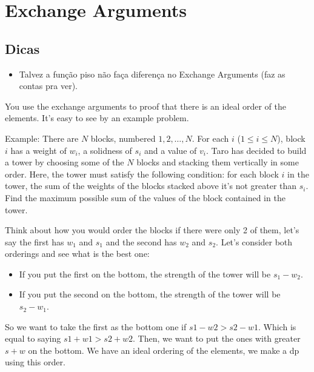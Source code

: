 \section{Exchange Arguments}

\subsection{Dicas}
\begin{itemize}
    \item Talvez a função piso não faça diferença no Exchange Arguments (faz as contas pra ver).
\end{itemize}

You use the exchange arguments to proof that there is an ideal order of the elements. It's easy to see 
by an example problem.

Example: There are $N$ blocks, numbered $1,2,\dots, N$. For each $i$ ($1 \le i \le N$), 
block $i$ has a weight of $w_i$, a solidness of $s_i$ and a value of $v_i$. Taro has decided to build 
a tower by choosing some of the $N$ blocks and stacking them vertically in some order. Here, the tower 
must satisfy the following condition: for each block $i$ in the tower, the sum of the weights of the 
blocks stacked above it's not greater than $s_i$. Find the maximum possible sum of the values of the 
block contained in the tower.

Think about how you would order the blocks if there were only 2 of them, let's say the first has $w_1$ 
and $s_1$ and the second has $w_2$ and $s_2$. Let's consider both orderings and see what is the best 
one:
\begin{itemize}
    \item If you put the first on the bottom, the strength of the tower will be $s_1-w_2$.
    \item If you put the second on the bottom, the strength of the tower will be $s_2-w_1$.
\end{itemize}

So we want to take the first as the bottom one if $s1-w2 > s2-w1$. Which is equal to saying $s1+w1 > s2+w2$. Then, we want to put the ones with greater $s+w$ on the bottom. We have an ideal ordering of the elements, we make a dp using this order.
